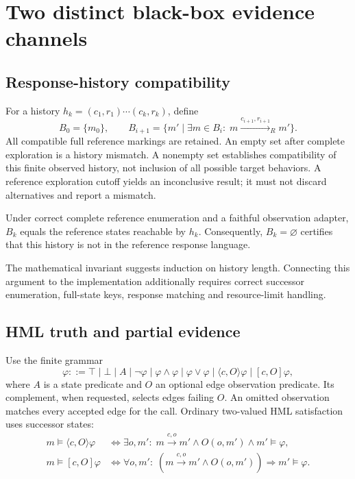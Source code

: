 \section{Two distinct black-box evidence channels}
\subsection{Response-history compatibility}
For a history $h_k=(c_1,r_1)\cdots(c_k,r_k)$, define
\begin{equation}\label{eq:belief}
 B_0=\{m_0\},\qquad
 B_{i+1}=\{m'\mid \exists m\in B_i:\;m\xrightarrow{c_{i+1},r_{i+1}}_R m'\}.
\end{equation}
All compatible full reference markings are retained. An empty set after complete
exploration is a history mismatch. A nonempty set establishes compatibility of
this finite observed history, not inclusion of all possible target behaviors.
A reference exploration cutoff yields an inconclusive result; it must not discard
alternatives and report a mismatch.

\begin{obligation}
Under correct complete reference enumeration and a faithful observation adapter,
$B_k$ equals the reference states reachable by $h_k$. Consequently, $B_k=\varnothing$
certifies that this history is not in the reference response language.
\end{obligation}
The mathematical invariant suggests induction on history length. Connecting this
argument to the implementation additionally requires correct successor enumeration,
full-state keys, response matching and resource-limit handling.

\subsection{HML truth and partial evidence}
Use the finite grammar
\[
 \varphi ::= \top\mid\bot\mid A\mid\neg\varphi
 \mid\varphi\land\varphi\mid\varphi\lor\varphi
 \mid\langle c,O\rangle\varphi\mid[c,O]\varphi,
\]
where $A$ is a state predicate and $O$ an optional edge observation predicate.
Its complement, when requested, selects edges failing $O$. An omitted observation
matches every accepted edge for the call. Ordinary two-valued HML satisfaction
uses successor states:
\begin{align*}
 m\models\langle c,O\rangle\varphi
 &\iff \exists o,m':\;m\xrightarrow{c,o}m'\land O(o,m')\land m'\models\varphi,\\
 m\models[c,O]\varphi
 &\iff \forall o,m':\;(m\xrightarrow{c,o}m'\land O(o,m'))\Rightarrow m'\models\varphi.
\end{align*}

